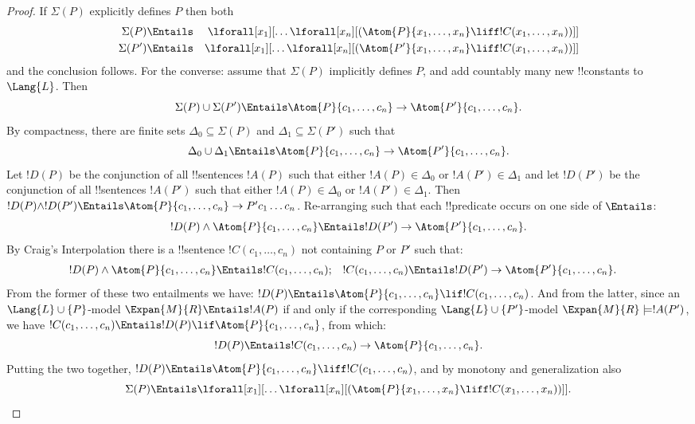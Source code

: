\documentclass[../../include/open-logic-section]{subfiles}
\begin{document}
\begin{proof}
If $\Sigma(P)$ explicitly defines $P$ then both
\begin{align*}
  \Sigma(P) & \Entails & \lforall[x_1][\dots \lforall[x_n]
    [(\Atom{P}{x_1,\dots, x_n} \liff !C(x_1,\dots,x_n))]]\\
  \Sigma(P') & \Entails & \lforall[x_1][\dots \lforall[x_n]
    [(\Atom{P'}{x_1,\dots, x_n} \liff !C(x_1,\dots,x_n))]]
\end{align*}
and the conclusion follows. For the converse: assume that $\Sigma(P)$
implicitly defines $P$, and add countably many new !!{constant}s to
$\Lang{L}$. Then
\[
\Sigma(P) \cup \Sigma(P') \Entails \Atom{P}{c_1, \dots, c_n} \to  \Atom{P'}{c_1, \dots, c_n}.
\]
By compactness, there are finite sets $\Delta_0 \subseteq \Sigma(P)$
and $\Delta_1 \subseteq \Sigma(P')$ such that
\[
\Delta_0 \cup \Delta_1 \Entails \Atom{P}{c_1, \dots, c_n} \to \Atom{P'}{c_1, \dots, c_n}.
\]
Let $!D(P)$ be the conjunction of all !!{sentence}s $!A(P)$ such
that either $!A(P) \in \Delta_0$ or $!A(P') \in \Delta_1$ and let
$!D(P')$ be the conjunction of all !!{sentence}s $!A(P')$ such
that either $!A(P) \in \Delta_0$ or $!A(P') \in \Delta_1$. Then
$!D(P) \land !D(P') \Entails \Atom{P}{c_1, \dots, c_n} \to P'c_1\dots
c_n$. Re-arranging such that each !!{predicate} occurs on one side of
$\Entails$:
\[
!D(P) \land \Atom{P}{c_1, \dots, c_n} \Entails !D(P') \to \Atom{P'}{c_1, \dots, c_n}.
\]
By Craig's Interpolation there is a !!{sentence} $!C(c_1,\dots, c_n)$
not containing $P$ or $P'$ such that:
\begin{align*}
  !D(P) \land \Atom{P}{c_1, \dots, c_n} & \Entails !C(c_1,\dots, c_n); &
  !C(c_1,\dots, c_n) & \Entails !D(P') \to \Atom{P'}{c_1, \dots, c_n}.
\end{align*}
From the former of these two entailments we have: $!D(P) \Entails
\Atom{P}{c_1,\dots, c_n} \lif !C(c_1,\dots, c_n)$. And from the
latter, since an $\Lang{L} \cup \{P\}$-model $\Expan{M}{R}
\Entails !A(P)$ if and only if the corresponding $\Lang{L} \cup
\{P'\}$-model $\Expan{M}{R} \models !A(P')$, we have
$!C(c_1,\dots, c_n) \Entails !D(P) \lif \Atom{P}{c_1,\dots, c_n}$,
from which:
\[
!D(P) \Entails !C(c_1,\dots,c_n) \to \Atom{P}{c_1,\dots, c_n}.
\]
Putting the two together, $!D(P) \Entails \Atom{P}{c_1,\dots, c_n}
\liff !C(c_1, \dots, c_n)$, and by monotony and generalization also
\[
\Sigma(P) \Entails
\lforall[x_1][\dots\lforall[x_n][(\Atom{P}{x_1,\dots, x_n} \liff
    !C(x_1,\dots, x_n))]].\qedhere
\]

\end{proof}
\end{document}

